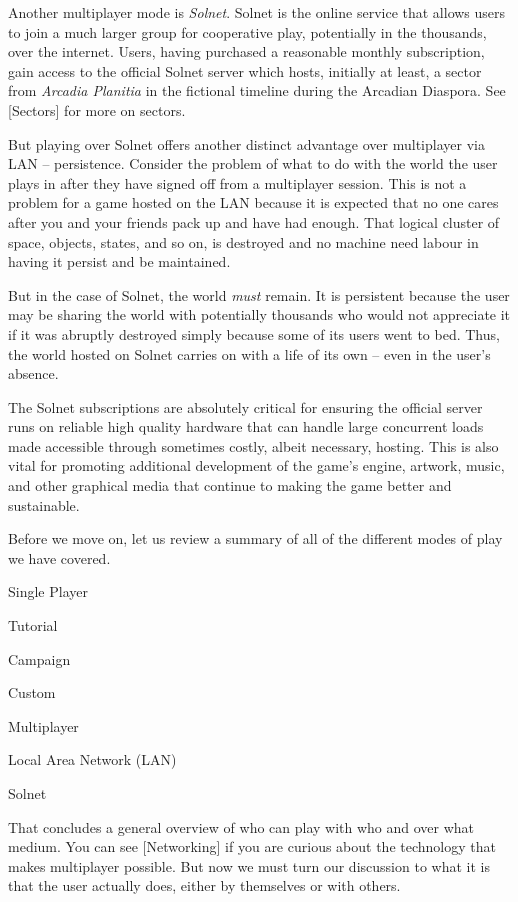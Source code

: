 

Another multiplayer mode is {\it Solnet}. Solnet is the online service that allows users to join a much larger group for cooperative play, potentially in the thousands, over the internet. Users, having purchased a reasonable monthly subscription, gain access to the official Solnet server which hosts, initially at least, a sector from {\it Arcadia Planitia} in the fictional timeline during the Arcadian Diaspora. See [Sectors] for more on sectors.

But playing over Solnet offers another distinct advantage over multiplayer via LAN -- persistence. Consider the problem of what to do with the world the user plays in after they have signed off from a multiplayer session. This is not a problem for a game hosted on the LAN because it is expected that no one cares after you and your friends pack up and have had enough. That logical cluster of space, objects, states, and so on, is destroyed and no machine need labour in having it persist and be maintained. 

But in the case of Solnet, the world {\it must} remain. It is persistent because the user may be sharing the world with potentially thousands who would not appreciate it if it was abruptly destroyed simply because some of its users went to bed. Thus, the world hosted on Solnet carries on with a life of its own -- even in the user's absence.

The Solnet subscriptions are absolutely critical for ensuring the official server runs on reliable high quality hardware that can handle large concurrent loads made accessible through sometimes costly, albeit necessary, hosting. This is also vital for promoting additional development of the game's engine, artwork, music, and other graphical media that continue to making the game better and sustainable.

Before we move on, let us review a summary of all of the different modes of play we have covered.

\startitemize[4]
    \item Single Player
        \startitemize[4]
        \item Tutorial
        \item Campaign
        \item Custom
        \stopitemize

    \item Multiplayer
        \startitemize[4]
        \item Local Area Network (LAN)
        \item Solnet
        \stopitemize
\stopitemize

That concludes a general overview of who can play with who and over what medium. You can see [Networking] if you are curious about the technology that makes multiplayer possible. But now we must turn our discussion to what it is that the user actually does, either by themselves or with others.

